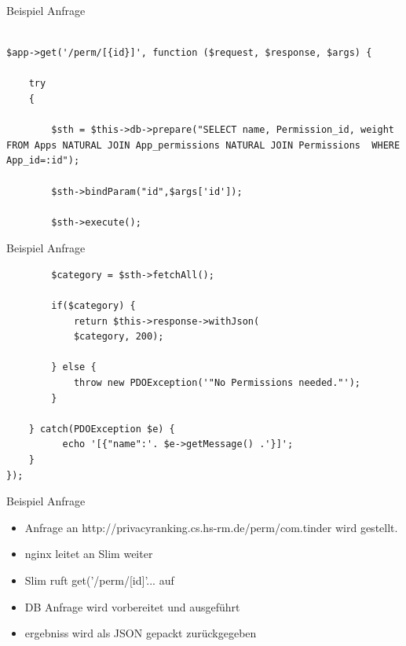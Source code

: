 \documentclass[compress,t]{beamer}
\begin{document}
\begin {frame}[fragile]{Beispiel Anfrage}

    \begin{center}
        \begin{lstlisting}

$app->get('/perm/[{id}]', function ($request, $response, $args) {

    try
    {

        $sth = $this->db->prepare("SELECT name, Permission_id, weight  FROM Apps NATURAL JOIN App_permissions NATURAL JOIN Permissions  WHERE App_id=:id");

        $sth->bindParam("id",$args['id']);

        $sth->execute();

        \end{lstlisting}
    \end{center}

\end{frame}

\begin {frame}[fragile]{Beispiel Anfrage}

    \begin{center}
        \begin{lstlisting}
        $category = $sth->fetchAll();

        if($category) {
            return $this->response->withJson(
            $category, 200);

        } else {
            throw new PDOException('"No Permissions needed."');
        }

    } catch(PDOException $e) {
          echo '[{"name":'. $e->getMessage() .'}]';
    }
});
        \end{lstlisting}
    \end{center}

\end{frame}

\begin {frame}{Beispiel Anfrage}

    \begin{center}
         \begin{itemize}
            \item Anfrage an http://privacyranking.cs.hs-rm.de/perm/com.tinder wird gestellt.
            \item nginx leitet an Slim weiter
            \item Slim ruft get('/perm/[{id}]'... auf
            \item DB Anfrage wird vorbereitet und ausgeführt
            \item ergebniss wird als JSON gepackt zurückgegeben
        \end{itemize}
    \end{center}

\end{frame}
\end{document}
